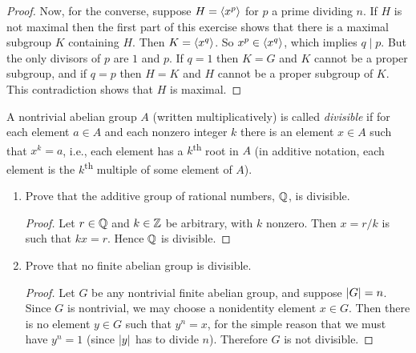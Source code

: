 \begin{enumerate}
\begin{proof}
    Now, for the converse, suppose $H = \langle{x^p}\rangle$ for $p$ a prime
    dividing $n$. If $H$ is not maximal then the first part of this
    exercise shows that there is a maximal subgroup $K$ containing
    $H$. Then $K = \langle{x^q}\rangle$. So $x^p\in\langle{x^q}\rangle$, which implies
    $q\mid p$. But the only divisors of $p$ are $1$ and $p$. If
    $q = 1$ then $K = G$ and $K$ cannot be a proper subgroup, and if
    $q = p$ then $H = K$ and $H$ cannot be a proper subgroup of
    $K$. This contradiction shows that $H$ is maximal.
  \end{proof}
\end{enumerate}

 A nontrivial abelian group $A$ (written
multiplicatively) is called {\em divisible} if for each element
$a\in A$ and each nonzero integer $k$ there is an element $x\in A$
such that $x^k = a$, i.e., each element has a $k$\textsuperscript{th}
root in $A$ (in additive notation, each element is the
$k$\textsuperscript{th} multiple of some element of $A$).
\begin{enumerate}
\item Prove that the additive group of rational numbers, $\mathbb{Q}$, is
  divisible.
  \begin{proof}
    Let $r\in\mathbb{Q}$ and $k\in\mathbb{Z}$ be arbitrary, with $k$ nonzero. Then
    $x = r/k$ is such that $kx = r$. Hence $\mathbb{Q}$ is divisible.
  \end{proof}
\item Prove that no finite abelian group is divisible.
  \begin{proof}
    Let $G$ be any nontrivial finite abelian group, and suppose
    $\lvert{G}\rvert = n$. Since $G$ is nontrivial, we may choose a
    nonidentity element $x\in G$. Then there is no element $y\in G$
    such that $y^n = x$, for the simple reason that we must have
    $y^n = 1$ (since $\lvert{y}\rvert$ has to divide $n$). Therefore $G$ is
    not divisible.
  \end{proof}
\end{enumerate}
